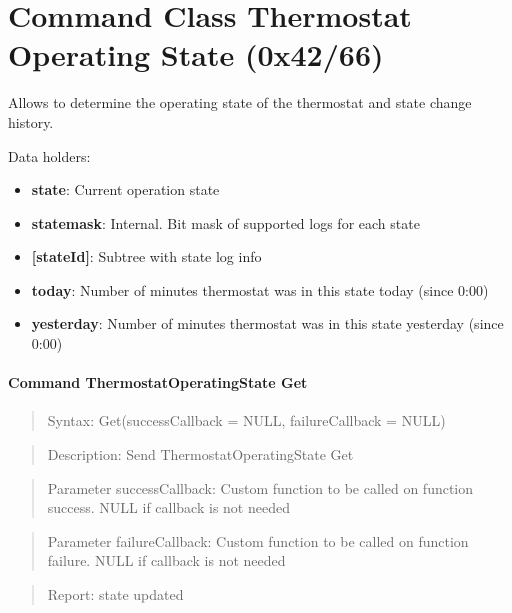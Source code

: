 \section{Command Class Thermostat Operating State (0x42/66)}

Allows to determine the operating state of the thermostat and state change history.
\newline

\noindent
Data holders:

\begin{itemize}
\item \textbf{state}: Current operation state
\item \textbf{statemask}: Internal. Bit mask of supported logs for each state
\item \textbf{[stateId]}: Subtree with state log info
\item \qquad\textbf{today}: Number of minutes thermostat was in this state today (since 0:00)
\item \qquad\textbf{yesterday}: Number of minutes thermostat was in this state yesterday (since 0:00)
\end{itemize}

\paragraph{Command ThermostatOperatingState Get}
\begin{quote}Syntax: Get(successCallback = NULL, failureCallback = NULL)\end{quote}
\begin{quote}Description: Send ThermostatOperatingState Get\end{quote}
\begin{quote}Parameter successCallback: Custom function to be called on function success. NULL if callback is not needed\end{quote}
\begin{quote}Parameter failureCallback: Custom function to be called on function failure. NULL if callback is not needed\end{quote}
\begin{quote}Report: state updated\end{quote}

